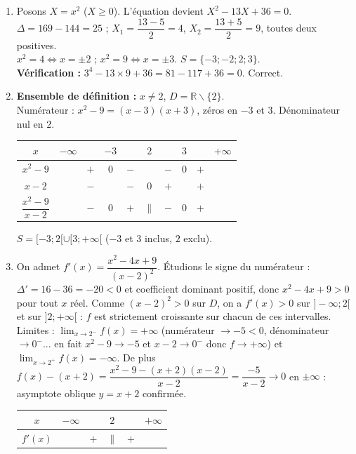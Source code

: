 \documentclass[11pt]{article}
\def\setminus{\mathbin{\backslash}}\let\smallsetminus\setminus
\begin{document}
\begin{corrige}
\begin{enumerate}
    \item Posons $X=x^2$ ($X\ge 0$). L'équation devient $X^2-13X+36=0$. $\Delta=169-144=25$ ; $X_1=\dfrac{13-5}{2}=4$, $X_2=\dfrac{13+5}{2}=9$, toutes deux positives.\\
    $x^2=4 \iff x=\pm 2$ ; $x^2=9 \iff x=\pm 3$. $S=\{-3;-2;2;3\}$.\\
    \textbf{Vérification :} $3^4-13\times 9+36=81-117+36=0$. Correct.
    \item \textbf{Ensemble de définition :} $x\neq 2$, $D=\mathbb{R}\setminus\{2\}$.\\
    Numérateur : $x^2-9=(x-3)(x+3)$, zéros en $-3$ et $3$. Dénominateur nul en $2$.
    \begin{center}
    \begin{tabular}{|c|ccccccccc|}\hline
    $x$ & $-\infty$ & & $-3$ & & $2$ & & $3$ & & $+\infty$ \\ \hline
    $x^2-9$ & & $+$ & $0$ & $-$ & & $-$ & $0$ & $+$ & \\ \hline
    $x-2$ & & $-$ & & $-$ & $0$ & $+$ & & $+$ & \\ \hline
    $\dfrac{x^2-9}{x-2}$ & & $-$ & $0$ & $+$ & $\|$ & $-$ & $0$ & $+$ & \\ \hline
    \end{tabular}
    \end{center}
    $S=[-3;2[\cup[3;+\infty[$ ($-3$ et $3$ inclus, $2$ exclu).
    \item On admet $f'(x)=\dfrac{x^2-4x+9}{(x-2)^2}$. Étudions le signe du numérateur : $\Delta'=16-36=-20<0$ et coefficient dominant positif, donc $x^2-4x+9>0$ pour tout $x$ réel. Comme $(x-2)^2>0$ sur $D$, on a $f'(x)>0$ sur $]-\infty;2[$ et sur $]2;+\infty[$ : $f$ est strictement croissante sur chacun de ces intervalles.\\
    Limites : $\lim_{x\to 2^-}f(x)=+\infty$ (numérateur $\to -5<0$, dénominateur $\to 0^-$... en fait $x^2-9\to -5$ et $x-2\to 0^-$ donc $f\to +\infty$) et $\lim_{x\to 2^+}f(x)=-\infty$. De plus $f(x)-(x+2)=\dfrac{x^2-9-(x+2)(x-2)}{x-2}=\dfrac{-5}{x-2}\to 0$ en $\pm\infty$ : asymptote oblique $y=x+2$ confirmée.
    \begin{center}
    \begin{tabular}{|c|ccccc|}\hline
    $x$ & $-\infty$ & & $2$ & & $+\infty$ \\ \hline
    $f'(x)$ & & $+$ & $\|$ & $+$ & \\ \hline

\end{tabular}
\end{center}
\end{enumerate}
\end{corrige}
\end{document}
